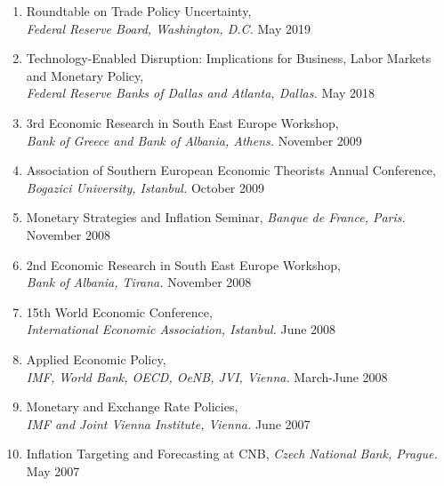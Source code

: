 \documentclass[10pt]{article}
\begin{document}
\begin{enumerate}
\item Roundtable on Trade Policy Uncertainty, \\ \textit{Federal Reserve Board, Washington, D.C.}                                                                                                                                    \hfill May 2019 
\item  Technology-Enabled Disruption: Implications for Business, Labor Markets and Monetary Policy, \\ \textit{Federal Reserve Banks of Dallas and Atlanta, Dallas.}                                                                                                                                    \hfill May 2018 
\item 3rd Economic Research in South East Europe Workshop, \\ \textit{Bank of Greece and Bank of Albania, Athens.}                                                                                                                                    \hfill November 2009 
\item Association of Southern European Economic Theorists Annual Conference, \\ \textit{Bogazici University, Istanbul.}                                                                                                                                      \hfill October 2009	
\item Monetary Strategies and Inflation Seminar, \textit{Banque de France, Paris. }      \hfill            November 2008 
\item 2nd Economic Research in South East Europe Workshop, \\ \textit{Bank of Albania, Tirana.} 
                                                                                                                                            \hfill      November 2008 
\item 15th World Economic Conference, \\ \textit{International Economic Association, Istanbul.}   \hfill    June 2008	
\item Applied Economic Policy, \\ \textit{IMF, World Bank, OECD, OeNB, JVI, Vienna.}    \hfill        March-June 2008	 
\item Monetary and Exchange Rate Policies, \\ \textit{IMF and Joint Vienna Institute, Vienna.}     \hfill       June 2007	
\item Inflation Targeting and Forecasting at CNB, \textit{Czech National Bank, Prague.}      \hfill                May 2007	

\end{enumerate}
\end{document}

